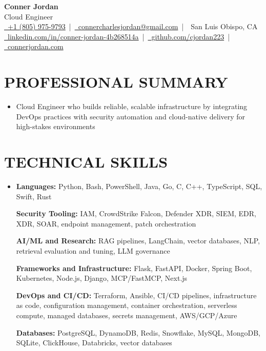 \documentclass[letterpaper,10pt]{article}
\newcommand{\resumeSubHeadingListStart}{\begin{itemize}[leftmargin=0in,label={}]}
\newcommand{\resumeSubHeadingListEnd}{\end{itemize}}
\begin{document}
\begin{center}
  {\Huge \textbf{Conner Jordan}}\\[0pt]
  {\Large Cloud Engineer}\\[0pt]
  \href{tel:+18059759793}{\faPhone\ +1 (805) 975-9793} \,|\, 
  \href{mailto:connercharlesjordan@gmail.com}{\faEnvelope\ connercharlesjordan@gmail.com} \,|\, 
  \faMapMarker\ San Luis Obispo, CA \\[-2pt]
  \href{https://www.linkedin.com/in/conner-jordan-4b268514a/}{\faLinkedin\ linkedin.com/in/conner-jordan-4b268514a}
  \,|\, \href{https://github.com/cjordan223}{\faGithub\ github.com/cjordan223}
  \,|\, \href{https://connerjordan.com/}{\faGlobe\ connerjordan.com}
\end{center}

\vspace{4pt}

\section{PROFESSIONAL SUMMARY}
\vspace{8pt}
\resumeSubHeadingListStart
\item {\small
Cloud Engineer who builds reliable, scalable infrastructure by integrating DevOps practices with security automation and cloud-native delivery for high-stakes environments}
\resumeSubHeadingListEnd
\vspace{6pt}

\section{TECHNICAL SKILLS}
\vspace{6pt}
\resumeSubHeadingListStart
\item {\small
\textbf{Languages:} Python, Bash, PowerShell, Java, Go, C, C++, TypeScript, SQL, Swift, Rust

\vspace{3pt}
\textbf{Security Tooling:} IAM, CrowdStrike Falcon, Defender XDR, SIEM, EDR, XDR, SOAR, endpoint management, patch orchestration

\vspace{3pt}
\textbf{AI/ML and Research:} RAG pipelines, LangChain, vector databases, NLP, retrieval evaluation and tuning, LLM governance

\vspace{3pt}
\textbf{Frameworks and Infrastructure:} Flask, FastAPI, Docker, Spring Boot, Kubernetes, Node.js, Django, MCP/FastMCP, Next.js

\vspace{3pt}
\textbf{DevOps and CI/CD:} Terraform, Ansible, CI/CD pipelines, infrastructure as code, configuration management, container orchestration, serverless compute, managed databases, secrets management, AWS/GCP/Azure

\vspace{3pt}
\textbf{Databases:} PostgreSQL, DynamoDB, Redis, Snowflake, MySQL, MongoDB, SQLite, ClickHouse, Databricks, vector databases
}
\resumeSubHeadingListEnd
\vspace{6pt}
\end{document}
